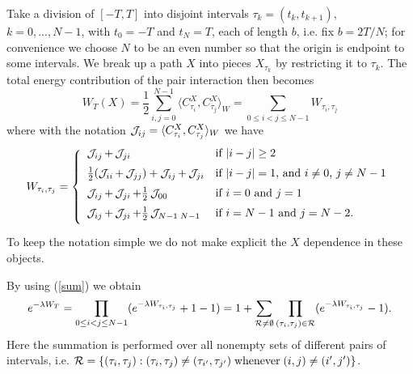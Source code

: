 \documentclass[a4paper,11pt]{article}
\newcommand{\J}{\mathop{\mathrm{{\cal J}}}\nolimits}
\begin{document}
\medskip
Take a division of $[-T,T]$ into disjoint intervals $\tau_k = (t_k, 
t_{k+1})$,  $k = 0,..., N-1$, with $t_0 = -T$ and $t_N = T$, each of 
length $b$, i.e. fix $b = 2T/N$; for convenience we choose $N$ to be 
an even number so that the origin is endpoint to some intervals. We 
break up a path $X$ into pieces $X_{\tau_k}$ by restricting it to 
$\tau_k$. The total energy contribution of the pair interaction then
becomes
\begin{equation}
W_T(X) = \frac{1}{2} \sum_{i,j = 0}^{N-1} 
\langle C^X_{\tau_i},C^X_{\tau_j}\rangle_W  = 
\sum_{0 \leq i < j \leq N-1} W_{\tau_i,\tau_j}
\label{sum}
\end{equation}
where with the notation $\J_{ij} = 
\langle C^X_{\tau_i},C^X_{\tau_j}\rangle_W$ we have
\begin{equation}
W_{\tau_i,\tau_j} 
= \left\{ 
\begin{array}{ll}
\vspace{0.2cm} 
\J_{ij} + \J_{ji} & \mbox{if $|i-j| \geq 2$} \nonumber \\
\vspace{0.2cm} 
\frac{1}{2} (\J_{ii} + \J_{jj}) + \J_{ij} + \J_{ji}  
& \mbox{if $|i-j| = 1$, and 
$i \neq 0$, $j \neq N - 1$} \nonumber \\
\vspace{0.2cm} 
\J_{ij} + \J_{ji} + \frac{1}{2} \J_{00} 
& \mbox{if $i = 0$ and $j = 1$} \nonumber \\ 
\vspace{0.2cm} 
\J_{ij} + \J_{ji} + \frac{1}{2} \J_{N-1 \; N-1} 
& \mbox{if $i = N-1$ and $j = N-2$.} \nonumber \\
\end{array} \right.
\end{equation}
To keep the notation simple we do not make explicit the $X$ 
dependence in these objects.

By using (\ref{sum}) we obtain
\begin{equation}
e^{-\lambda W_T} = \prod_{0 \leq i < j \leq N-1} 
(e^{-\lambda W_{\tau_i,\tau_j}} + 1 - 1) =  1 + \sum_{{\cal R} \neq 
\emptyset} \prod_{(\tau_i,\tau_j) \in {\cal R}} 
(e^{-\lambda W_{\tau_i,\tau_j}} - 1).
\label{sum1}
\end{equation}
Here the summation is performed over all nonempty sets of different 
pairs of intervals, i.e. ${\cal R} = \{(\tau_i,\tau_j): 
(\tau_i, \tau_j) \neq (\tau_{i'},\tau_{j'}) \; \mbox{whenever} \; (i,j) 
\neq (i',j') \}$. 
\end{document}
